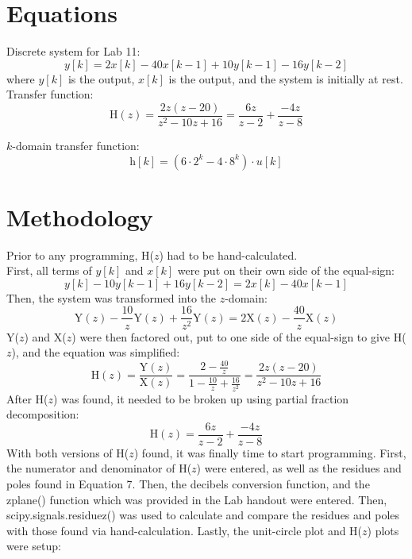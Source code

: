 \documentclass[12pt]{report}
\begin{document}
\section{Equations}
Discrete system for Lab 11:
\begin{equation}
    y[k] = 2x[k] - 40x[k-1] + 10y[k-1] - 16y[k-2]
\end{equation}
where $y[k]$ is the output, $x[k]$ is the output, and the system is initially at rest.\\

Transfer function:
\begin{equation}
    \text{H}(z) = \frac{2z(z-20)}{z^{2} - 10z + 16} = \frac{6z}{z-2} + \frac{-4z}{z-8}
\end{equation}

$k$-domain transfer function:
\begin{equation}
    \text{h}[k] = (6 \cdot 2^{k} - 4 \cdot 8^{k}) \cdot u[k]
\end{equation}

\pagebreak

\section{Methodology}
Prior to any programming, H($z$) had to be hand-calculated.\\
First, all terms of $y[k]$ and $x[k]$ were put on their own side of the equal-sign:
\begin{equation}
    y[k] - 10y[k-1] + 16y[k-2] = 2x[k] - 40x[k-1]
\end{equation}
Then, the system was transformed into the $z$-domain:
\begin{equation}
    \text{Y}(z)-\frac{10}{z}\text{Y}(z)+\frac{16}{z^{2}}\text{Y}(z)=2\text{X}(z)-\frac{40}{z}\text{X}(z)
\end{equation}
Y($z$) and X($z$) were then factored out, put to one side of the equal-sign to give H($z$), and the equation was simplified:
\begin{equation}
    \text{H}(z) = \frac{\text{Y}(z)}{\text{X}(z)} = \frac{2-\frac{40}{z}}{1-\frac{10}{z}+\frac{16}{z^{2}}} = \frac{2z(z-20)}{z^{2}-10z+16}
\end{equation}
After H($z$) was found, it needed to be broken up using partial fraction decomposition:
\begin{equation}
    \text{H}(z) = \frac{6z}{z-2}+\frac{-4z}{z-8}
\end{equation}
With both versions of H($z$) found, it was finally time to start programming. First, the numerator and denominator of H($z$) were entered, as well as the residues and poles found in Equation 7. Then, the decibels conversion function, and the zplane() function which was provided in the Lab handout were entered. Then,\\ scipy.signals.residuez() was used to calculate and compare the residues and poles with those found via hand-calculation. Lastly, the unit-circle plot and H($z$) plots were setup:\\
\end{document}
